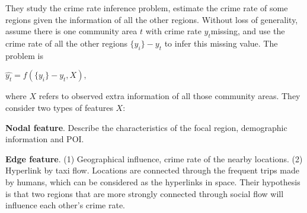 \documentclass[11pt]{article}
\begin{document}
They study the crime rate inference problem, estimate the crime rate of some regions given the information of all the other regions. Without loss of generality, assume there is one community area $t$ with crime rate $y_t$missing, and  use the crime rate of all the other regions $\{y_i\}-y_t$ to infer this missing value. The problem is

$\hat{y_t}=f(\{y_i\}- y_t,X), $

where $X$ refers to observed extra information of all those community areas. They consider two types of features $X$:
\begin{description}
\item \textbf{Nodal feature}. Describe the characteristics of the focal region, demographic information and POI.

\item \textbf{Edge feature}. (1) Geographical influence, crime rate of the nearby locations. (2) Hyperlink by taxi flow. Locations are connected through the frequent trips made by humans, which can be considered as the hyperlinks in space.  Their hypothesis is that two regions that are more strongly connected through social flow will influence each other’s crime rate.
\end{description}


 
\end{document}

